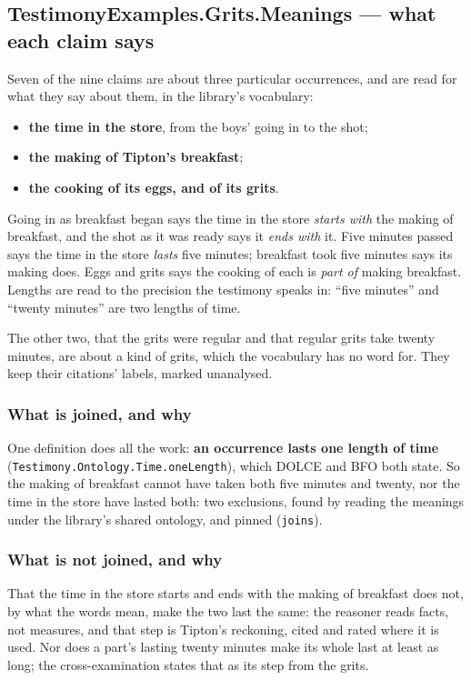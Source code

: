 \documentclass[11pt]{article}
\begin{document}
\subsection*{TestimonyExamples.Grits.Meanings — what each claim says}
Seven of the nine claims are about three particular occurrences, and are read for what they say about them, in the library’s vocabulary:

\begin{itemize}
  \item \textbf{the time in the store}, from the boys’ going in to the shot;
  \item \textbf{the making of Tipton’s breakfast};
  \item \textbf{the cooking of its eggs, and of its grits}.
\end{itemize}
Going in as breakfast began says the time in the store \emph{starts with} the making of breakfast, and the shot as it was ready says it \emph{ends with} it. Five minutes passed says the time in the store \emph{lasts} five minutes; breakfast took five minutes says its making does. Eggs and grits says the cooking of each is \emph{part of} making breakfast. Lengths are read to the precision the testimony speaks in: “five minutes” and “twenty minutes” are two lengths of time.

The other two, that the grits were regular and that regular grits take twenty minutes, are about a kind of grits, which the vocabulary has no word for. They keep their citations’ labels, marked unanalysed.

\subsubsection*{What is joined, and why}
One definition does all the work: \textbf{an occurrence lasts one length of time} (\texttt{Testimony.Ontology.Time.one\allowbreak{}Length}), which DOLCE and BFO both state. So the making of breakfast cannot have taken both five minutes and twenty, nor the time in the store have lasted both: two exclusions, found by reading the meanings under the library’s shared ontology, and pinned (\texttt{joins}).

\subsubsection*{What is not joined, and why}
That the time in the store starts and ends with the making of breakfast does not, by what the words mean, make the two last the same: the reasoner reads facts, not measures, and that step is Tipton’s reckoning, cited and rated where it is used. Nor does a part’s lasting twenty minutes make its whole last at least as long; the cross-examination states that as its step from the grits.
\end{document}
